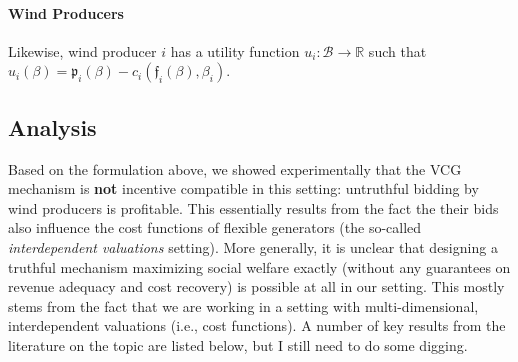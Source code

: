 \documentclass{article}
\begin{document}
\paragraph{Wind Producers} Likewise, wind producer $i$ has a utility function $u_i: \mathcal{B} \rightarrow \mathbb{R}$ such that $u_i(\beta) = \mathfrak{p}_i(\beta) - c_i(\mathfrak{f}_i(\beta), \beta_i)$.


\subsection{Analysis}

Based on the formulation above, we showed experimentally that the VCG mechanism is \textbf{not} incentive compatible in this setting: untruthful bidding by wind producers is profitable. This essentially results from the fact the their bids also influence the cost functions of flexible generators (the so-called \textit{interdependent valuations} setting). More generally, it is unclear that designing a truthful mechanism maximizing social welfare exactly (without any guarantees on revenue adequacy and cost recovery) is possible at all in our setting. This mostly stems from the fact that we are working in a setting with multi-dimensional, interdependent valuations (i.e., cost functions). A number of key results from the literature on the topic are listed below, but I still need to do some digging.
\end{document}
